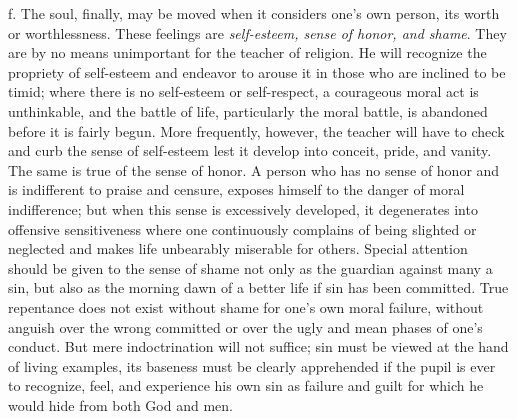 f. The soul, finally, may be moved when it considers one’s own person, its worth or worthlessness. These feelings are \emph{self-esteem, sense of honor, and shame}. They are by no means unimportant for the teacher of religion. He will recognize the propriety of self-esteem and endeavor to arouse it in those who are inclined to be timid; where there is no self-esteem or self-respect, a courageous moral act is unthinkable, and the battle of life, particularly the moral battle, is abandoned before it is fairly begun. More frequently, however, the teacher will have to check and curb the sense of self-esteem lest it develop into conceit, pride, and vanity. The same is true of the sense of honor. A person who has no sense of honor and is indifferent to praise and censure, exposes himself to the danger of moral indifference; but when this sense is excessively developed, it degenerates into offensive sensitiveness where one continuously complains of being slighted or neglected and makes life unbearably miserable for others. Special attention should be given to the sense of shame not only as the guardian against many a sin, but also as the morning dawn of a better life if sin has been committed. True repentance does not exist without shame for one’s own moral failure, without anguish over the wrong committed or over the ugly and mean phases of one’s conduct. But mere indoctrination will not suffice; sin must be viewed at the hand of living examples, its baseness must be clearly apprehended if the pupil is ever to recognize, feel, and experience his own sin as failure and guilt for which he would hide from both God and men.

